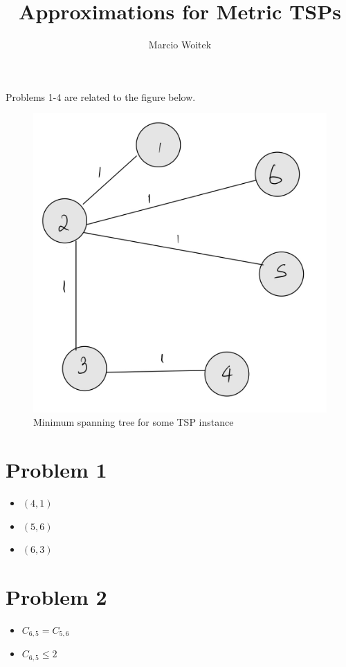 \documentclass[11pt]{article}
\author{Marcio Woitek}
\date{}
\title{Approximations for Metric TSPs}
\begin{document}
\maketitle
\thispagestyle{empty}
\pagestyle{empty}

Problems 1-4 are related to the figure below.
\begin{figure}[H]
  \centering
  \includegraphics[scale=0.15]{tsp_mst_quiz.jpeg}
  \caption{Minimum spanning tree for some TSP instance}
\end{figure}
\section*{Problem 1}
\label{sec:org46250a8}
\begin{itemize}
\item \((4,1)\)
\item \((5,6)\)
\item \((6,3)\)
\end{itemize}
\section*{Problem 2}
\label{sec:org376a94a}
\begin{itemize}
\item \(C_{6,5}=C_{5,6}\)
\item \(C_{6,5}\leq 2\)
\end{itemize}
\end{document}

